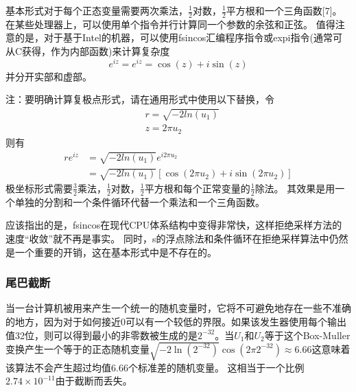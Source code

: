 \documentclass[twoside,twocolumn]{article}
\begin{document}
\begin{CJK*}{UTF8}{gkai}
	基本形式对于每个正态变量需要两次乘法，$\frac{1}{2}$对数，$\frac{1}{2}$平方根和一个三角函数[7]。在某些处理器上，可以使用单个指令并行计算同一个参数的余弦和正弦。 值得注意的是，对于基于Intel的机器，可以使用fsincos汇编程序指令或expi指令(通常可从C获得，作为内部函数)来计算复杂度
	\begin{equation*}
	e^{iz}=e^{iz}=\cos(z)+i\sin(z)
	\end{equation*}
	并分开实部和虚部。
	
	注：要明确计算复极点形式，请在通用形式中使用以下替换，令
	\begin{equation*}
	\begin{aligned}
	 &r={\sqrt {-2ln(u_{1})}}\\
	 &z=2\pi u_{2}
	\end{aligned}
	\end{equation*}
	则有
	\begin{equation*}
	\begin{aligned}
	re^{iz}&={\sqrt {-2ln(u_{1})}}e^{i2\pi u_{2}}\\
	&={\sqrt {-2ln(u_{1})}}\left[\cos(2\pi u_{2})+i\sin(2\pi u_{2})\right]
	\end{aligned}
	\end{equation*}
	极坐标形式需要$\frac{3}{2}$乘法，$\frac{1}{2}$对数，$\frac{1}{2}$平方根和每个正常变量的$\frac{1}{2}$除法。 其效果是用一个单独的分割和一个条件循环代替一个乘法和一个三角函数。

	应该指出的是，fsincos在现代CPU体系结构中变得非常快，这样拒绝采样方法的速度“收敛”就不再是事实。 同时，s的浮点除法和条件循环在拒绝采样算法中仍然是一个重要的开销，这在基本形式中是不存在的。 
\subsubsection{尾巴截断}
	当一台计算机被用来产生一个统一的随机变量时，它将不可避免地存在一些不准确的地方，因为对于如何接近0可以有一个较低的界限。如果该发生器使用每个输出值32位，则可以得到最小的非零数被生成的是$2^{-32}$。当$U_{1}$和$U_{2}$等于这个Box-Muller变换产生一个等于的正态随机变量$\sqrt {-2\ln(2^{-32})}\cos(2\pi 2^{-32})\approx 6.66$这意味着该算法不会产生超过均值6.66个标准差的随机变量。 这相当于一个比例$2.74 \times 10 ^ {-11}$由于截断而丢失。

\end{CJK*}
\end{document}
